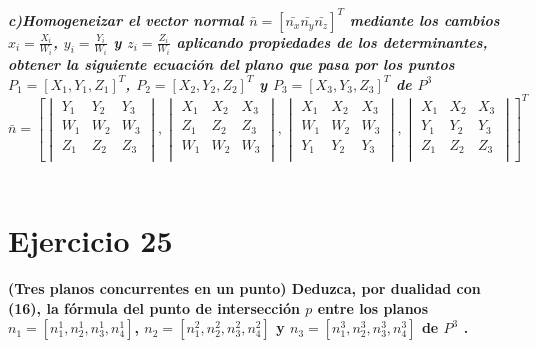 \documentclass[12pt]{article}
\begin{document}
\textit{\textbf{
c)Homogeneizar el vector normal $\bar{n}=[\bar{n_{x}} \bar{n_{y}} \bar{n_{z}}]^{T}$ mediante los cambios $x_{i}=\frac{X_{i}}{W_{i}}$, $y_{i}=\frac{Y_{i}}{W_{i}}$  y $z_{i}=\frac{Z_{i}}{W_{i}}$ aplicando propiedades de los determinantes, obtener la siguiente ecuación del plano que pasa por los puntos $P_{1} = [X_{1},Y_{1}, Z_{1}]^{T}$, $P_{2} = [X_{2},Y_{2}, Z_{2}]^{T}$ y $P_{3} = [X_{3},Y_{3}, Z_{3}]^{T}$ de $P^{3}$
}}
$$\bar{n} = \left[ \begin{vmatrix}
Y_{1} & Y_{2}  & Y_{3} \\
W_{1} & W_{2}  & W_{3} \\
Z_{1} & Z_{2}  & Z_{3} \\
\end{vmatrix}  ,
\begin{vmatrix}
X_{1} & X_{2}  & X_{3} \\
Z_{1} & Z_{2}  & Z_{3} \\
W_{1} & W_{2}  & W_{3} \\
\end{vmatrix} ,
\begin{vmatrix}
X_{1} & X_{2}  & X_{3} \\
W_{1} & W_{2}  & W_{3} \\
Y_{1} & Y_{2}  & Y_{3} \\
\end{vmatrix} ,
\begin{vmatrix}
X_{1} & X_{2}  & X_{3} \\
Y_{1} & Y_{2}  & Y_{3} \\
Z_{1} & Z_{2}  & Z_{3} \\
\end{vmatrix}
\right]^{T}$$
\\

\section{Ejercicio 25}
\textbf{
(Tres planos concurrentes en un punto)
Deduzca, por dualidad con (16), la fórmula del punto de intersección $p$ entre los
planos $n_{1}=[n_{1}^{1}, n_{2}^{1}, n_{3}^{1}, n_{4} ^{1}]$, $n_{2}=[n_{1}^{2}, n_{2}^{2}, n_{3}^{2}, n_{4} ^{2}]$ y $n_{3}=[n_{1}^{3}, n_{2}^{3}, n_{3}^{3}, n_{4} ^{3}]$ de
$P^{3}$ .
}
\end{document}
